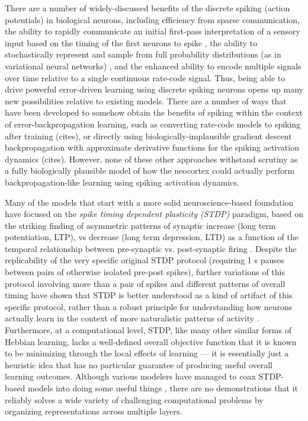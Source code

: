 \documentclass[11pt,twoside]{article}
\newif\myifpdf
\begin{document}
There are a number of widely-discussed benefits of the discrete spiking (action potentials) in biological neurons, including efficiency from sparse communication, the ability to rapidly communicate an initial first-pass interpretation of a sensory input based on the timing of the first neurons to spike \citep{ThorpeDelormeVanRullen01}, the ability to stochastically represent and sample from full probability distributions (as in variational neural networks) \citep{McKeeCrandellChaudhuriEtAl21,etc}, and the enhanced ability to encode multiple signals over time relative to a single continuous rate-code signal.  Thus, being able to drive powerful error-driven learning using discrete spiking neurons opens up many new possibilities relative to existing models.  There are a number of ways that have been developed to somehow obtain the benefits of spiking within the context of error-backpropagation learning, such as converting rate-code models to spiking after training (cites), or directly using biologically-implausible gradient descent backpropagation with approximate derivative functions for the spiking activation dynamics (cites).  However, none of these other approaches withstand scrutiny as a fully biologically plausible model of how the neocortex could actually perform backpropagation-like learning using spiking activation dynamics.

Many of the models that start with a more solid neuroscience-based foundation have focused on the \textit{spike timing dependent plasticity (STDP)} paradigm, based on the striking finding of asymmetric patterns of synaptic increase (long term potentiation, LTP), vs decrease (long term depression, LTD) as a function of the temporal relationship between pre-synaptic vs. post-synaptic firing  \citep{BiPoo98,etc}.  Despite the replicability of the very specific original STDP protocol (requiring 1 s pauses between pairs of otherwise isolated pre-post spikes), further variations of this protocol involving more than a pair of spikes and different patterns of overall timing have shown that STDP is better understood as a kind of artifact of this specific protocol, rather than a robust principle for understanding how neurons actually learn in the context of more naturalistic patterns of activity \citep{ShouvalWangWittenberg10,GraupnerBrunel12}.  Furthermore, at a computational level, STDP, like many other similar forms of Hebbian learning, lacks a well-defined overall objective function that it is known to be minimizing through the local effects of learning --- it is essentially just a heuristic idea that has no particular guarantee of producing useful overall learning outcomes.  Although various modelers have managed to coax STDP-based models into doing some useful things \citep{KheradpishehGanjtabeshThorpeEtAl18}, there are no demonstrations that it reliably solves a wide variety of challenging computational problems by organizing representations across multiple layers.
\end{document}
